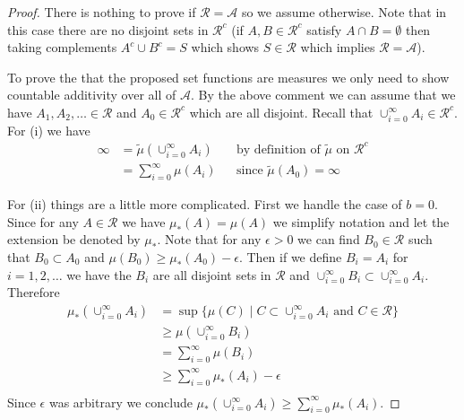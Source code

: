 \documentclass{amsart}
\theoremstyle{remark}
\theoremstyle{definition}
\begin{document}
\begin{proof}
There is nothing to prove if $\mathcal{R} =
\mathcal{A}$ so we assume otherwise.  Note that in this case there are no
disjoint sets in $\mathcal{R}^c$ (if $A,B \in \mathcal{R}^c$ satisfy
$A \cap B = \emptyset$ then taking complements $A^c \cup B^c = S$
which shows $S \in \mathcal{R}$ which implies $\mathcal{R} =
\mathcal{A}$).

To prove the that the proposed set functions are measures we only need
to show countable additivity over all of $\mathcal{A}$.  By the above
comment we can assume that we have $A_1, A_2, \dots \in \mathcal{R}$
and $A_0 \in \mathcal{R}^c$ which are all disjoint.  Recall that $\cup_{i=0}^\infty
A_i \in \mathcal{R}^c$.  For (i) we have
\begin{align*}
\infty &= \tilde{\mu}(\cup_{i=0}^\infty A_i ) & &\text{by
  definition of $\tilde{\mu}$ on $\mathcal{R}^c$} \\
&=\sum_{i=0}^\infty \mu(A_i) & & \text{since $\tilde{\mu}(A_0)=\infty$}
\end{align*}

For (ii) things are a little more complicated.  First we handle the
case of $b=0$.  Since for any $A \in \mathcal{R}$ we have $\mu_*(A) =
\mu(A)$ we simplify notation and let the extension be denoted by $\mu_*$.  Note that 
for any $\epsilon > 0$ we can find $B_0 \in \mathcal{R}$ such that
$B_0 \subset A_0$ and $\mu(B_0) \geq \mu_*(A_0) -\epsilon$.  Then if
we define $B_i = A_i$ for $i=1,2,\dotsc$ we have the $B_i$ are all disjoint sets in
$\mathcal{R}$ and $\cup_{i=0}^\infty B_i \subset \cup_{i=0}^\infty A_i $.  Therefore
\begin{align*}
\mu_*(\cup_{i=0}^\infty A_i) &= \sup \lbrace \mu(C) \mid C \subset
\cup_{i=0}^\infty A_i \text{ and } C \in \mathcal{R}\rbrace \\
&\geq \mu(\cup_{i=0}^\infty B_i) \\
&= \sum_{i=0}^\infty \mu(B_i) \\
&\geq \sum_{i=0}^\infty \mu_*(A_i) - \epsilon \\
\end{align*}
Since $\epsilon$ was arbitrary we conclude
$\mu_*(\cup_{i=0}^\infty A_i) \geq \sum_{i=0}^\infty \mu_*(A_i)$.


\end{proof}
\end{document}
